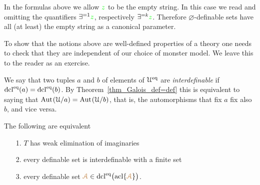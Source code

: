 In the formulas above we allow ${\color{green} z}$ to be the empty string.
In this case we read  and  omitting the quantifiers $\exists^{=1}{\color{green} z}$, respectively $\exists^{=k}{\color{green} z}$.
Therefore $\varnothing$-definable sets have all (at least) the empty string as a canonical parameter.

To show that the notions above are well-defined properties of a theory one needs to check that they are independent of our choice of monster model.
We leave this to the reader as an exercise.

We say that two tuples $a$ and $b$ of elements of $\EuScript U^{{\rm eq}}$ are \emph{interdefinable\/} if ${\rm dcl}^{{\rm eq}}(a)={\rm dcl}^{{\rm eq}}(b)$.
By Theorem~\ref{thm_Galois_def=def} this is equivalent to saying that ${\rm Aut\kern.15ex}(\EuScript U/a)={\rm Aut\kern.15ex}(\EuScript U/b)$, that is, the automorphisms that fix $a$ fix also $b$, and vice versa.

\begin{theorem}\label{thm_elimimd}
The following are equivalent
\begin{itemize}
\item[1.] $T$ has weak elimination of imaginaries
\item[2.] every definable set is interdefinable with a finite set
\item[3.] every definable set ${\color{brown}\EuScript A}\in{\rm dcl}^{{\rm eq}}\big({\rm acl}\{{\color{brown}\EuScript A}\}\big)$.
\end{itemize}
\end{theorem}


